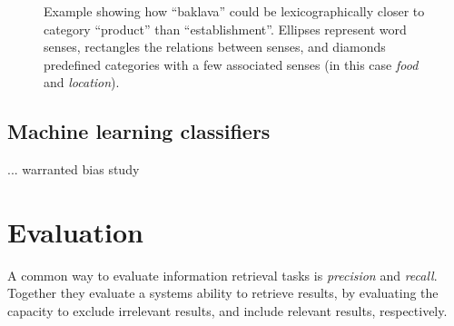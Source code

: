 \documentclass[a4paper,11pt]{kth-mag}
\newcommand{\todo}{ ... }
\begin{document}
\begin{figure}[t]
  \centering
  \caption{Example showing how ``baklava'' could be lexicographically closer to category ``product'' than ``establishment''. Ellipses represent word senses, rectangles the relations between senses, and diamonds predefined categories with a few associated senses (in this case \emph{food} and \emph{location}).}
  \label{fig:baklava_lex}
\end{figure}

\subsection{Machine learning classifiers}

\todo
warranted bias study

\clearpage



\section{Evaluation}
\label{sec:precision_recall}
A common way to evaluate information retrieval tasks is \emph{precision}
and \emph{recall}. Together they evaluate a systems ability to retrieve results,
by evaluating the capacity to exclude irrelevant results,
and include relevant results, respectively.
\end{document}
